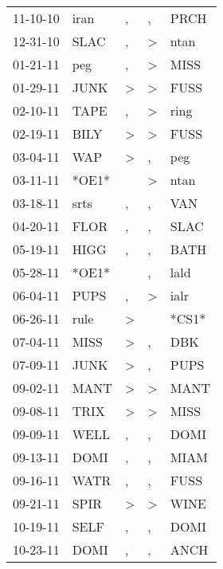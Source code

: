 \begin{supertabular}{lllll}
 11-10-10 &   iran &                , &                , &   PRCH \\
 12-31-10 &   SLAC &                , &     \textgreater &   ntan \\
 01-21-11 &    peg &                , &     \textgreater &   MISS \\
 01-29-11 &   JUNK &     \textgreater &     \textgreater &   FUSS \\
 02-10-11 &   TAPE &                , &     \textgreater &   ring \\
 02-19-11 &   BILY &     \textgreater &     \textgreater &   FUSS \\
 03-04-11 &    WAP &     \textgreater &                , &    peg \\
 03-11-11 &  *OE1* &                  &     \textgreater &   ntan \\
 03-18-11 &   srts &                , &                , &    VAN \\
 04-20-11 &   FLOR &                , &                , &   SLAC \\
 05-19-11 &   HIGG &                , &                , &   BATH \\
 05-28-11 &  *OE1* &                  &                , &   lald \\
 06-04-11 &   PUPS &                , &     \textgreater &   ialr \\
 06-26-11 &   rule &     \textgreater &                  &  *CS1* \\
 07-04-11 &   MISS &     \textgreater &                , &    DBK \\
 07-09-11 &   JUNK &     \textgreater &                , &   PUPS \\
 09-02-11 &   MANT &     \textgreater &     \textgreater &   MANT \\
 09-08-11 &   TRIX &     \textgreater &     \textgreater &   MISS \\
 09-09-11 &   WELL &                , &                , &   DOMI \\
 09-13-11 &   DOMI &                , &                , &   MIAM \\
 09-16-11 &   WATR &                , &                , &   FUSS \\
 09-21-11 &   SPIR &     \textgreater &     \textgreater &   WINE \\
 10-19-11 &   SELF &                , &                , &   DOMI \\
 10-23-11 &   DOMI &                , &                , &   ANCH \\

\end{supertabular}
